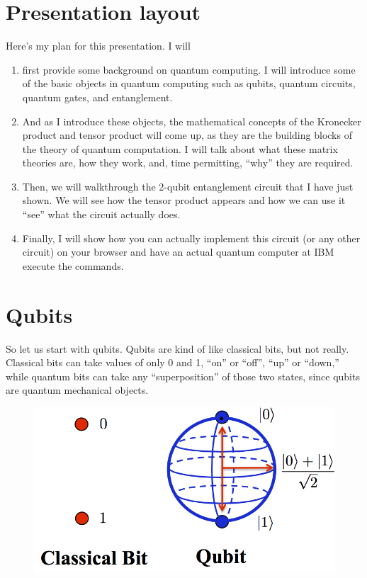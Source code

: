 \documentclass[a4paper,11pt]{article}
\numberwithin{equation}{section}
\theoremstyle{definition}
\begin{document}
\section{Presentation layout}
Here's my plan for this presentation. I will 
\begin{enumerate}
	\item first provide some background on quantum computing. I will introduce some of the basic objects in quantum computing such as qubits, quantum circuits, quantum gates, and entanglement. 
	\item And as I introduce these objects, the mathematical concepts of the Kronecker product and tensor product will come up, as they are the building blocks of the theory of quantum computation. I will talk about what these matrix theories are, how they work, and, time permitting, ``why'' they are required.
	\item  Then, we will walkthrough the 2-qubit entanglement circuit that I have just shown. We will see how the tensor product appears and how we can use it ``see'' what the circuit actually does.
	\item Finally, I will show how you can actually implement this circuit (or any other circuit) on your browser and have an actual quantum computer at IBM execute the commands.
\end{enumerate}

\section{Qubits}
So let us start with qubits. Qubits are kind of like classical bits, but not really. Classical bits can take values of only 0 and 1, ``on'' or ``off'', ``up'' or ``down,'' while quantum bits can take any ``superposition'' of those two states, since qubits are quantum mechanical objects.

\begin{figure}[h!]
	\centering
	\includegraphics[scale=0.35]{atom1.png}
\end{figure}
\end{document}
